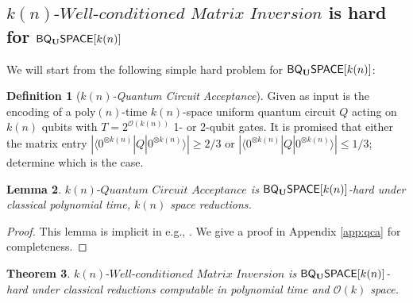 \documentclass[11pt]{article}
\newtheorem{theorem}{Theorem}
\newtheorem{lemma}[theorem]{Lemma}
\theoremstyle{definition}
\newtheorem{definition}[theorem]{Definition}
\theoremstyle{remark}
\newcommand\matrixinvert[1]{{\ensuremath{#1}}\textit{-Well-conditioned Matrix Inversion}}
\newcommand\qca[1]{\ensuremath{#1}\textit{-Quantum Circuit Acceptance}}
\newcommand{\zero}{\ensuremath{0^{\otimes{k(n)}}}}
\newcommand{\classfont}{\sf}
\newcommand{\Unitary}{\mathbf{U}}
\newcommand{\unitaryBQSPACE}[1]{{\classfont{BQ}_\Unitary\classfont{SPACE}}[#1]}
\newcommand\bigoh{\mathcal{O}}
\newcommand{\poly}{\textrm{poly}}
\begin{document}
\subsection{$\matrixinvert{k(n)}$ is hard for $\unitaryBQSPACE{k(n)}$} \label{sec: matrix inversion hard}
We will start from the following simple hard problem for $\unitaryBQSPACE{k(n)}$:
\begin{definition}[\qca{k(n)}]
	Given as input is the encoding of a $\poly(n)$-time $k(n)$-space uniform quantum circuit $Q$ acting on $k(n)$ qubits with $T = 2^{\mathcal{O}(k(n))}$ 1- or 2-qubit gates.  It is promised that either the matrix entry $|\langle {\zero}|Q|{\zero}\rangle| \geq 2/3$ or $|\langle {\zero}|Q|{\zero}\rangle| \leq 1/3$; determine which is the case.
\end{definition}
\begin{lemma} \label{lem: quantum circuit acceptance}
	$\qca{k(n)}$ is $\unitaryBQSPACE{k(n)}$-hard under classical polynomial time, $k(n)$ space reductions.
\end{lemma}
\begin{proof}This lemma is implicit in e.g., \cite{bbbv,dawsonnielsen}.  We give a proof in Appendix \ref{app:qca} for completeness.
\end{proof}
\begin{theorem}
$\matrixinvert{k(n)}$ is $\unitaryBQSPACE{k(n)}$-hard under classical reductions computable in polynomial time and $\bigoh (k)$ space.
\end{theorem}
\end{document}
